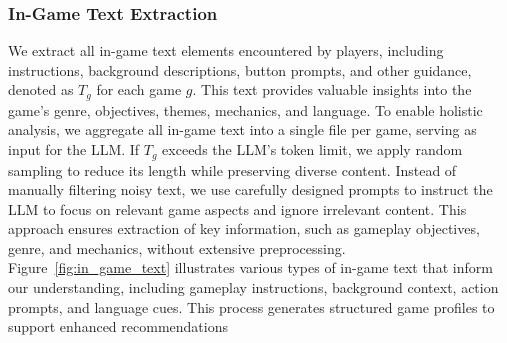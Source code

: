 
\subsubsection{In-Game Text Extraction}
We extract all in-game text elements encountered by players, including instructions, background descriptions, button prompts, and other guidance, denoted as $T_g$ for each game $g$. This text provides valuable insights into the game’s genre, objectives, themes, mechanics, and language. To enable holistic analysis, we aggregate all in-game text into a single file per game, serving as input for the LLM. If $T_g$ exceeds the LLM’s token limit, we apply random sampling to reduce its length while preserving diverse content. Instead of manually filtering noisy text, we use carefully designed prompts to instruct the LLM to focus on relevant game aspects and ignore irrelevant content. This approach ensures extraction of key information, such as gameplay objectives, genre, and mechanics, without extensive preprocessing. Figure~\ref{fig:in_game_text} illustrates various types of in-game text that inform our understanding, including gameplay instructions, background context, action prompts, and language cues. This process generates structured game profiles to support enhanced recommendations

